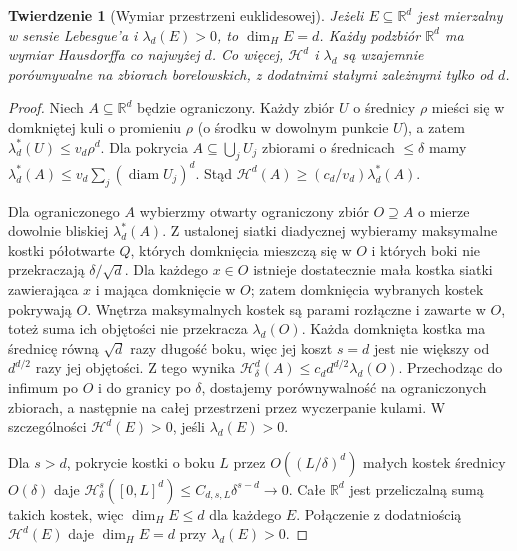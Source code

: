 \documentclass[11pt,a4paper,oneside]{book}
\numberwithin{equation}{chapter}
\theoremstyle{plain}
\newtheorem{twierdzenie}{Twierdzenie}[chapter]
\theoremstyle{definition}
\theoremstyle{remark}
\begin{document}
\begin{twierdzenie}[Wymiar przestrzeni euklidesowej]
\label{thm:euclidean-dimension-26}
Jeżeli $E\subseteq\mathbb R^d$ jest mierzalny
w sensie Lebesgue'a i $\lambda_d(E)>0$, to $\dim_HE=d$. Każdy podzbiór
$\mathbb R^d$ ma wymiar Hausdorffa co najwyżej $d$.
Co więcej, $\mathcal H^d$ i $\lambda_d$ są wzajemnie
porównywalne na zbiorach borelowskich, z dodatnimi
stałymi zależnymi tylko od $d$.
\end{twierdzenie}
\begin{proof}
Niech $A\subseteq\mathbb R^d$ będzie ograniczony.
Każdy zbiór $U$ o średnicy $\rho$ mieści się w domkniętej
kuli o promieniu $\rho$ (o środku w dowolnym punkcie $U$),
a zatem $\lambda_d^*(U)\le v_d\rho^d$.
Dla pokrycia $A\subseteq\bigcup_jU_j$ zbiorami o
średnicach $\le\delta$ mamy
$\lambda_d^*(A)\le v_d\sum_j(\operatorname{diam}U_j)^d$.
Stąd $\mathcal H^d(A)\ge(c_d/v_d)\lambda_d^*(A)$.

Dla ograniczonego $A$ wybierzmy otwarty ograniczony
zbiór $O\supseteq A$ o mierze dowolnie bliskiej
$\lambda_d^*(A)$. Z ustalonej siatki diadycznej wybieramy maksymalne
kostki półotwarte $Q$, których domknięcia mieszczą się
w $O$ i których boki nie przekraczają $\delta/\sqrt d$.
Dla każdego $x\in O$ istnieje dostatecznie mała kostka
siatki zawierająca $x$ i mająca domknięcie w $O$;
zatem domknięcia wybranych kostek pokrywają $O$.
Wnętrza maksymalnych kostek są parami rozłączne
i zawarte w $O$, toteż suma ich objętości nie
przekracza $\lambda_d(O)$. Każda domknięta kostka
ma średnicę równą $\sqrt d$ razy długość boku,
więc jej koszt $s=d$ jest nie większy od $d^{d/2}$
razy jej objętości. Z tego wynika
$\mathcal H^d_\delta(A)\le c_dd^{d/2}\lambda_d(O)$.
Przechodząc do infimum po $O$ i do granicy po $\delta$,
dostajemy porównywalność na ograniczonych zbiorach,
a następnie na całej przestrzeni przez wyczerpanie
kulami. W szczególności $\mathcal H^d(E)>0$, jeśli
$\lambda_d(E)>0$.

Dla $s>d$, pokrycie kostki o boku $L$ przez
$O((L/\delta)^d)$ małych kostek średnicy $O(\delta)$
daje $\mathcal H^s_\delta([0,L]^d)
\le C_{d,s,L}\delta^{s-d}\to0$.
Całe $\mathbb R^d$ jest przeliczalną sumą takich
kostek, więc $\dim_HE\le d$ dla każdego $E$.
Połączenie z dodatniością $\mathcal H^d(E)$ daje
$\dim_HE=d$ przy $\lambda_d(E)>0$.
\end{proof}
\end{document}
